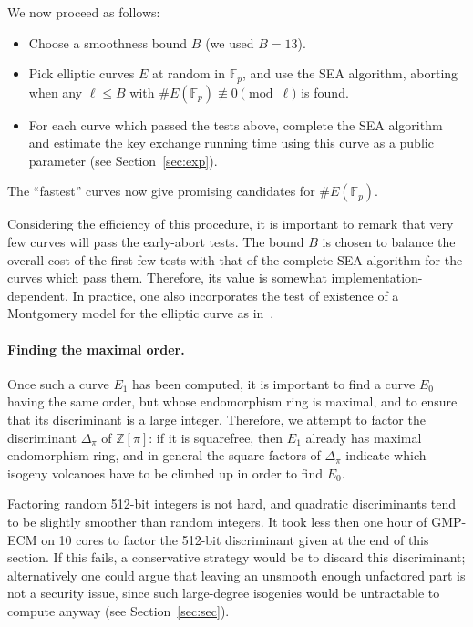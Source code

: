 \documentclass{llncs}
\newcommand{\F}{\mathbb{F}}
\newcommand{\Z}{\mathbb{Z}}
\begin{document}
We now proceed as follows:
\begin{itemize}
\item Choose a smoothness bound $B$ (we used $B = 13$).
\item Pick elliptic curves $E$ at random in $\F_p$, and use the SEA algorithm,
aborting when any $\ell\leq B$ 
with $\#E(\F_p) \not\equiv 0\pmod{\ell}$ is found.
\item For each curve which passed the tests above, complete the SEA
algorithm and estimate the key exchange running time using this
curve as a public parameter (see Section~\ref{sec:exp}).
\end{itemize}
The ``fastest'' curves now give promising candidates for $\#E(\F_p)$.

Considering the efficiency of this procedure, it is important to remark
that very few curves will pass the early-abort tests. The bound $B$ is
chosen to balance the overall cost of the first few tests with that of
the complete SEA algorithm for the curves which pass them. Therefore,
its value is somewhat implementation-dependent. In practice, one also
incorporates the test of existence of a Montgomery model for the
elliptic curve as in~\cite{OKS00}.

\paragraph{Finding the maximal order.}
Once such a curve $E_1$ has been computed, it is important to find a curve
$E_0$ having the same order, but whose endomorphism ring is maximal, and
to ensure that its discriminant is a large integer. Therefore, we attempt to
factor the discriminant $Δ_\pi$ of $\Z[\pi]$: if it is squarefree,
then $E_1$ already has maximal endomorphism ring, and in general the square
factors of $Δ_\pi$ indicate which isogeny volcanoes have to be climbed up
in order to find $E_0$.

\begin{remark}
Factoring random 512-bit integers is not hard, and quadratic discriminants
tend to be slightly smoother than random integers.
It took less then one hour of GMP-ECM on 10 cores to factor the 512-bit discriminant
given at the end of this section. %
If this fails,
a conservative strategy would be to discard this discriminant; alternatively
one could argue that leaving an unsmooth enough unfactored part is not a
security issue, since such large-degree isogenies would be untractable to
compute anyway (see Section~\ref{sec:sec}).
\end{remark}
\end{document}
